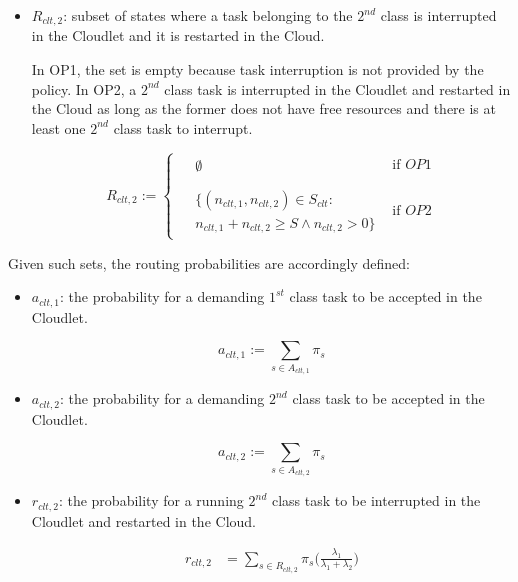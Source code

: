 \begin{itemize}
	\item $R_{clt,2}$: subset of states where  a task belonging to the $2^{nd}$ class is interrupted in the Cloudlet and it is restarted in the Cloud.
	
	In OP1, the set is empty because task interruption is not provided by the policy.
	In OP2, a $2^{nd}$ class task is interrupted in the Cloudlet and restarted in the Cloud as long as the former does not have free resources and there is at least one $2^{nd}$ class task to interrupt.
	
	\begin{equation}
		R_{clt,2} :=
		\left\{
		\begin{array}{ll}
			\begin{aligned}
				& \emptyset
			\end{aligned} & \mbox{if } OP1 \\
			\\
			\begin{aligned}
				& \{(n_{clt,1},n_{clt,2})\in S_{clt} : \\
				& n_{clt,1}+n_{clt,2}\geq S \wedge n_{clt,2}>0\}
			\end{aligned} & \mbox{if } OP2
		\end{array}
		\right.
	\end{equation}
\end{itemize}

Given such sets, the routing probabilities  are accordingly defined:

\begin{itemize}
	
	\item $a_{clt,1}$: the probability for a demanding $1^{st}$ class task to be accepted in the Cloudlet.
	
	\begin{equation} 
		a_{clt,1} := \sum_{s\in A_{clt,1}} \pi_{s}
	\end{equation}
	
	\item $a_{clt,2}$: the probability for a demanding $2^{nd}$ class task to be accepted in the Cloudlet.
	
	\begin{equation} 
		a_{clt,2} := \sum_{s\in A_{clt,2}} \pi_{s}
	\end{equation}
		
	\item $r_{clt,2}$: the probability for a running $2^{nd}$ class task to be interrupted in the Cloudlet and restarted in the Cloud.
	
	\begin{equation} 
		\begin{split}
			r_{clt,2} & = \sum_{s\in R_{clt,2}} \pi_{s} \Big(\frac{\lambda_{1}}{\lambda_{1}+\lambda_{2}}\Big) \\
		\end{split}
	\end{equation}
\end{itemize}

